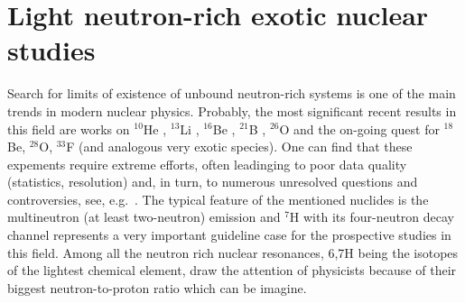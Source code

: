 \section{Light neutron-rich exotic nuclear studies}

Search for limits of existence of unbound neutron-rich systems is one of the main trends in modern nuclear physics.
Probably, the most significant recent results in this field are works on $^{10}$He \cite{Sidorchuk:2012,Kohley:2012,Jones:2015,Matta:2015}, $^{13}$Li \cite{Johansson:2010a,Kohley:2013b}, $^{16}$Be \cite{Spyrou:2012}, $^{21}$B \cite{Leblond:2018}, $^{26}$O \cite{Kohley:2013,Caesar:2013,Kondo:2016} and the on-going quest for $^{18}$Be, $^{28}$O, $^{33}$F \cite{Ahn:2019} (and analogous very exotic species). 
One can find that these expements require extreme efforts, often leadinging to poor data quality (statistics, resolution) and, in turn, to numerous unresolved questions and controversies, see, e.g.\ \cite{Grigorenko:2016,Fortune:2018}.
The typical feature of the mentioned nuclides is the multineutron (at least two-neutron) emission and $^{7}$H with its four-neutron decay channel represents a very important guideline case for the prospective studies in this field.
Among all the neutron rich nuclear resonances, 6,7H being the isotopes of the lightest chemical element, draw the attention of physicists because of their biggest neutron-to-proton ratio which can be imagine.


